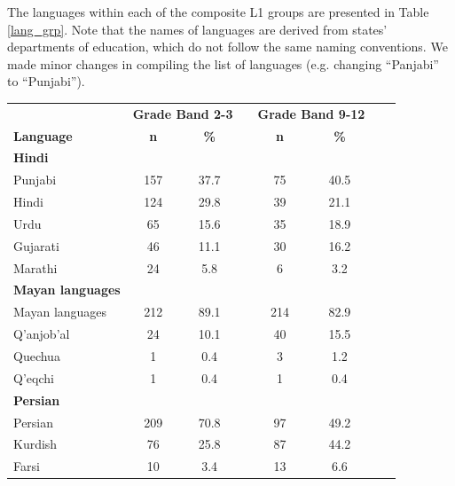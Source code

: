 \documentclass [PhD] {uclathes}
\begin{document}
The languages within each of the composite L1 groups are presented in Table \ref{lang_grp}. Note that the names of languages are derived from states’ departments of education, which do not follow the same naming conventions. We made minor changes in compiling the list of languages (e.g. changing “Panjabi” to “Punjabi”). 

\begin{table}[htbp]
\centering
\begin{tabular}{lccccccc}
\toprule
    & \multicolumn{2}{c}{\textbf{Grade Band 2-3}} & \multicolumn{1}{c}{ } & \multicolumn{2}{c}{\textbf{Grade Band 9-12}} \\
    \cline{2-3}
    \cline{5-6}
     \textbf{Language} & \textbf{n} & \textbf{\%} & & \textbf{n} & \textbf{\%} \\
    \midrule
\textbf{Hindi} & & & & & \\
\hspace{3mm} Punjabi & 157 & 37.7 & & 75 & 40.5 \\
\hspace{3mm} Hindi & 124 & 29.8 & & 39 & 21.1 \\
\hspace{3mm} Urdu & 65 & 15.6 & & 35 & 18.9 \\
\hspace{3mm} Gujarati & 46 & 11.1 & & 30 & 16.2 \\
\hspace{3mm} Marathi & 24 & 5.8 & & 6 & 3.2 \\
\textbf{Mayan languages} & & & & & \\
\hspace{3mm} Mayan languages & 212 & 89.1 & & 214 & 82.9 \\
\hspace{3mm} Q'anjob'al & 24 & 10.1 & & 40 & 15.5 \\
\hspace{3mm} Quechua & 1 & 0.4 & & 3 & 1.2 \\
\hspace{3mm} Q'eqchi & 1 & 0.4 & & 1 & 0.4 \\
\textbf{Persian} & & & & & \\
\hspace{3mm} Persian & 209 & 70.8 & & 97 & 49.2 \\
\hspace{3mm} Kurdish & 76 & 25.8 & & 87 & 44.2 \\
\hspace{3mm} Farsi & 10 & 3.4 & & 13 & 6.6 \\

\end{tabular}
\end{table}
\end{document}

